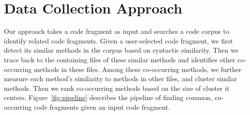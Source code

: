 \section{Data Collection Approach}
\label{sec:approach}
Our approach takes a code fragment as input and searches a code corpus to identify related code fragments. Given a user-selected code fragment, we first detect its similar methods in the corpus based on syntactic similarity. Then we trace back to the containing files of these similar methods and identifies other co-occurring methods in these files. Among these co-occurring methods, we further measure each method's similarity to methods in other files, and cluster similar methods. Then we rank co-occurring methods based on the size of cluster it centers. Figure~\ref{fig:pipeline} describes the pipeline of finding common, co-occurring code fragments given an input code fragment. 


